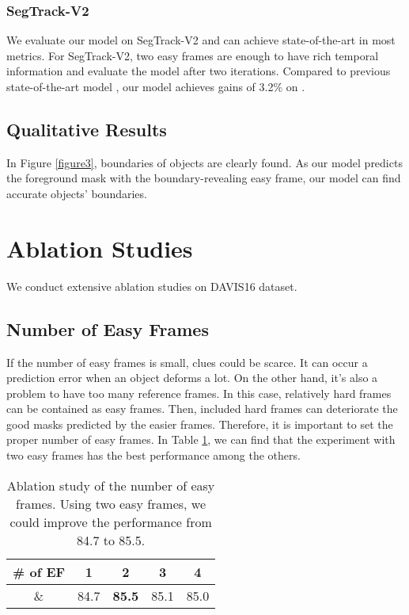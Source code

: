 \documentclass[letterpaper]{article} \usepackage{aaai22}  \usepackage{times}  \usepackage{helvet}  \usepackage{courier}  \usepackage[hyphens]{url}  \usepackage{graphicx} \urlstyle{rm} \def\UrlFont{\rm}  \usepackage{natbib}  \usepackage{caption} \DeclareCaptionStyle{ruled}{labelfont=normalfont,labelsep=colon,strut=off} \frenchspacing  \setlength{\pdfpagewidth}{8.5in}  \setlength{\pdfpageheight}{11in}  \usepackage{algorithm}
\begin{document}
\subsubsection{SegTrack-V2}

We evaluate our model on SegTrack-V2 and can achieve state-of-the-art in most metrics. For SegTrack-V2, two easy frames are enough to have rich temporal information and evaluate the model after two iterations. Compared to previous state-of-the-art model \citep{gu2020pyramid}, our model achieves gains of 3.2\% on .

\subsection{Qualitative Results}

In Figure \ref{figure3}, boundaries of objects are clearly found. As our model predicts the foreground mask with the boundary-revealing easy frame, our model can find accurate objects’ boundaries. 

\section{Ablation Studies}

We conduct extensive ablation studies on DAVIS16 \citep{Perazzi2016} dataset.

\subsection{Number of Easy Frames}

If the number of easy frames is small, clues could be scarce. It can occur a prediction error when an object deforms a lot. On the other hand, it’s also a problem to have too many reference frames. In this case, relatively hard frames can be contained as easy frames. Then, included hard frames can deteriorate the good masks predicted by the easier frames. Therefore, it is important to set the proper number of easy frames. In Table \ref{table4}, we can find that the experiment with two easy frames has the best performance among the others. 

\begin{table}[h]
\centering
\caption{Ablation study of the number of easy frames. Using two easy frames, we could improve the performance from 84.7 to 85.5.}
\begin{tabular}{@{}c|cccc@{}}
\toprule
\# of EF & 1    & 2             & 3    & 4    \\ \midrule
\&     & 84.7 & \textbf{85.5} & 85.1 & 85.0 \\ \bottomrule
\end{tabular}
\label{table4}
\end{table}
\end{document}
